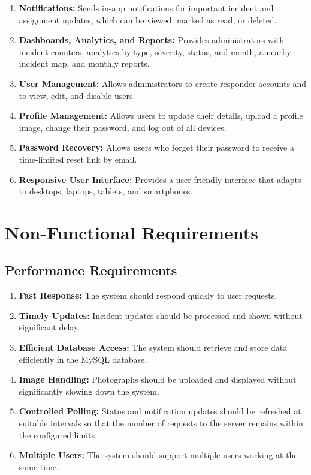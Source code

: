 \documentclass[a4paper,12pt]{report}
\begin{document}
\begin{enumerate}
		\item \textbf{Notifications:}
		Sends in-app notifications for important incident and assignment updates, which can be viewed, marked as read, or deleted.
		
		\item \textbf{Dashboards, Analytics, and Reports:}
		Provides administrators with incident counters, analytics by type, severity, status, and month, a nearby-incident map, and monthly reports.
		
		\item \textbf{User Management:}
		Allows administrators to create responder accounts and to view, edit, and disable users.
		
		\item \textbf{Profile Management:}
		Allows users to update their details, upload a profile image, change their password, and log out of all devices.
		
		\item \textbf{Password Recovery:}
		Allows users who forget their password to receive a time-limited reset link by email.
		
		\item \textbf{Responsive User Interface:}
		Provides a user-friendly interface that adapts to desktops, laptops, tablets, and smartphones.
		
	\end{enumerate}
	
	\section{Non-Functional Requirements}
	
	\subsection{Performance Requirements}
	
	\begin{enumerate}
		\item \textbf{Fast Response:} The system should respond quickly to user requests.
		
		\item \textbf{Timely Updates:} Incident updates should be processed and shown without significant delay.
		
		\item \textbf{Efficient Database Access:} The system should retrieve and store data efficiently in the MySQL database.
		
		\item \textbf{Image Handling:} Photographs should be uploaded and displayed without significantly slowing down the system.
		
		\item \textbf{Controlled Polling:} Status and notification updates should be refreshed at suitable intervals so that the number of requests to the server remains within the configured limits.
		
		\item \textbf{Multiple Users:} The system should support multiple users working at the same time.
	\end{enumerate}
	
\end{document}
